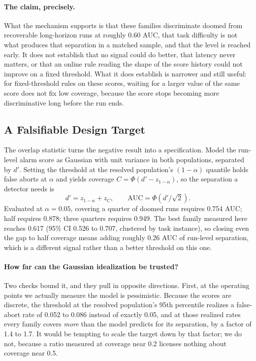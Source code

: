 \documentclass[sigconf,screen]{acmart}
\begin{document}
\paragraph{The claim, precisely.} What the mechanism supports is that these families discriminate
doomed from recoverable long-horizon runs at roughly 0.60 AUC, that task difficulty is not what
produces that separation in a matched sample, and that the level is reached early. It does not establish that no signal could do better, that latency
never matters, or that an online rule reading the shape of the score history could not improve on a
fixed threshold. What it does establish is narrower and still useful: for fixed-threshold rules on
these scores, waiting for a larger value of the same score does not fix low coverage, because the
score stops becoming more discriminative long before the run ends.
\subsection{A Falsifiable Design Target}
\label{sec:target}

The overlap statistic turns the negative result into a specification. Model the run-level alarm
score as Gaussian with unit variance in both populations, separated by $d'$. Setting the threshold
at the resolved population's $(1-\alpha)$ quantile holds false aborts at $\alpha$ and yields
coverage $C = \Phi(d' - z_{1-\alpha})$, so the separation a detector needs is
\begin{equation}
d' = z_{1-\alpha} + z_{C}, \qquad \mathrm{AUC} = \Phi\!\left(d'/\sqrt{2}\right).
\end{equation}
Evaluated at $\alpha = 0.05$, covering a quarter of doomed runs requires
0.754 AUC; half requires 0.878; three quarters requires 0.949. The best family measured here reaches
0.617 (95\% CI 0.526 to 0.707, clustered by task instance), so closing even the gap to half coverage
means adding roughly 0.26 AUC of run-level separation, which is a different signal rather than a
better threshold on this one.

\paragraph{How far can the Gaussian idealization be trusted?} Two checks bound it, and they pull in
opposite directions. First, at the operating points we actually measure the model is pessimistic.
Because the scores are discrete, the threshold at the resolved population's 95th percentile realizes
a false-abort rate of 0.052 to 0.086 instead of exactly 0.05, and at those realized rates every
family covers \emph{more} than the model predicts for its separation, by a factor of 1.4 to 1.7. It
would be tempting to scale the target down by that factor; we do not, because a ratio measured at
coverage near 0.2 licenses nothing about coverage near 0.5.
\end{document}
